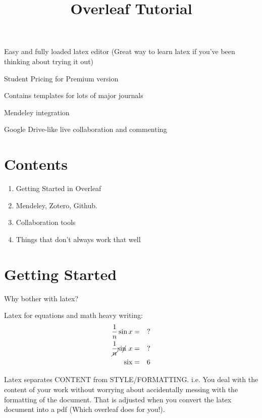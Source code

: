 \documentclass[draft]{agujournal2019}
\begin{document}
\title{Overleaf Tutorial}





\begin{keypoints}
\item Easy and fully loaded latex editor (Great way to learn latex if you've been thinking about trying it out)
\item Student Pricing for Premium version 
\item Contains templates for lots of major journals
\item Mendeley integration 
\item Google Drive-like live collaboration and commenting 

\end{keypoints}


\clearpage

\section*{Contents}
\begin{enumerate}
  \item Getting Started in Overleaf
  \item Mendeley, Zotero, Github.
  \item Collaboration tools
  \item Things that don't always work that well
\end{enumerate}

\clearpage
\section{Getting Started}



Why bother with latex?

Latex for equations and math heavy writing:
\begin{eqnarray*}
        \frac{1}{n}\sin x & = & \mathrm{?} \\
        \frac{1}{\cancel{n}} \mathrm{si}\cancel{\mathrm{n}} ~x & = & \mathrm{?} \\
        \mathrm{six} & = & 6
\end{eqnarray*}

Latex separates CONTENT from STYLE/FORMATTING. i.e. You deal with the content of your work without worrying about accidentally messing with the formatting of the document. That is adjusted when you convert the latex document into a pdf (Which overleaf does for you!).
\end{document}
